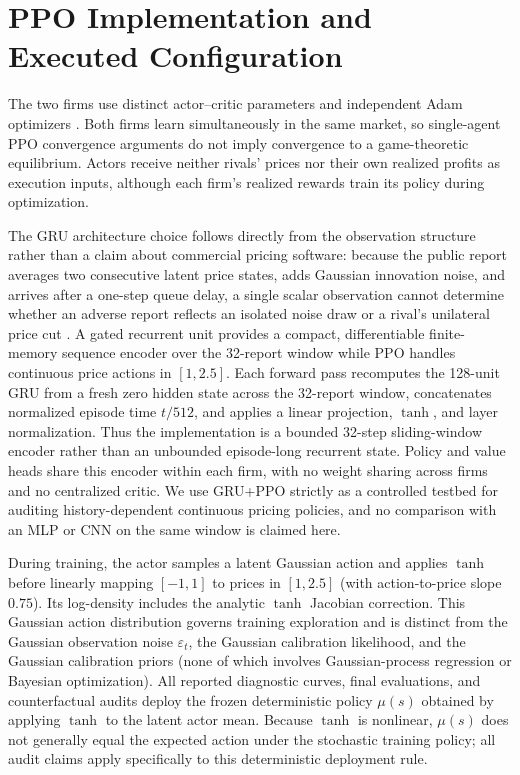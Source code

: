 \documentclass{article}
\begin{document}
\section{PPO Implementation and Executed Configuration}

The two firms use distinct actor--critic parameters and independent Adam optimizers \citep{schulman2017proximal}. Both firms learn simultaneously in the same market, so single-agent PPO convergence arguments do not imply convergence to a game-theoretic equilibrium. Actors receive neither rivals' prices nor their own realized profits as execution inputs, although each firm's realized rewards train its policy during optimization.

The GRU architecture choice follows directly from the observation structure rather than a claim about commercial pricing software: because the public report averages two consecutive latent price states, adds Gaussian innovation noise, and arrives after a one-step queue delay, a single scalar observation cannot determine whether an adverse report reflects an isolated noise draw or a rival's unilateral price cut \citep{green1984noncooperative, calvano2021algorithmic}. A gated recurrent unit \citep{cho2014gru} provides a compact, differentiable finite-memory sequence encoder over the 32-report window while PPO handles continuous price actions in $[1,2.5]$. Each forward pass recomputes the 128-unit GRU from a fresh zero hidden state across the 32-report window, concatenates normalized episode time $t/512$, and applies a linear projection, $\tanh$, and layer normalization. Thus the implementation is a bounded 32-step sliding-window encoder rather than an unbounded episode-long recurrent state. Policy and value heads share this encoder within each firm, with no weight sharing across firms and no centralized critic. We use GRU+PPO strictly as a controlled testbed for auditing history-dependent continuous pricing policies, and no comparison with an MLP or CNN on the same window is claimed here.

During training, the actor samples a latent Gaussian action and applies $\tanh$ before linearly mapping $[-1,1]$ to prices in $[1,2.5]$ (with action-to-price slope $0.75$). Its log-density includes the analytic $\tanh$ Jacobian correction. This Gaussian action distribution governs training exploration and is distinct from the Gaussian observation noise $\varepsilon_t$, the Gaussian calibration likelihood, and the Gaussian calibration priors (none of which involves Gaussian-process regression or Bayesian optimization). All reported diagnostic curves, final evaluations, and counterfactual audits deploy the frozen deterministic policy $\mu(s)$ obtained by applying $\tanh$ to the latent actor mean. Because $\tanh$ is nonlinear, $\mu(s)$ does not generally equal the expected action under the stochastic training policy; all audit claims apply specifically to this deterministic deployment rule.
\end{document}
